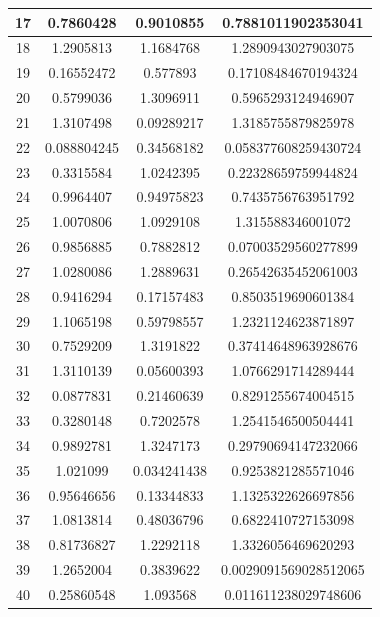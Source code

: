 \documentclass[10pt,a4paper, polish]{article}
\begin{document}
\begin{table}[H]
\begin{tabular}{|c|c|c|c|}
\hline
17 & 0.7860428 & 0.9010855 & 0.7881011902353041 \\
\hline
18 & 1.2905813 & 1.1684768 & 1.2890943027903075 \\
\hline
19 & 0.16552472 & 0.577893 & 0.17108484670194324 \\
\hline
20 & 0.5799036 & 1.3096911 & 0.5965293124946907 \\
\hline
21 & 1.3107498 & 0.09289217 & 1.3185755879825978 \\
\hline
22 & 0.088804245 & 0.34568182 & 0.058377608259430724 \\
\hline
23 & 0.3315584 & 1.0242395 & 0.22328659759944824 \\
\hline
24 & 0.9964407 & 0.94975823 & 0.7435756763951792 \\
\hline
25 & 1.0070806 & 1.0929108 & 1.315588346001072 \\
\hline
26 & 0.9856885 & 0.7882812 & 0.07003529560277899 \\
\hline
27 & 1.0280086 & 1.2889631 & 0.26542635452061003 \\
\hline
28 & 0.9416294 & 0.17157483 & 0.8503519690601384 \\
\hline
29 & 1.1065198 & 0.59798557 & 1.2321124623871897 \\
\hline
30 & 0.7529209 & 1.3191822 & 0.37414648963928676 \\
\hline
31 & 1.3110139 & 0.05600393 & 1.0766291714289444 \\
\hline
32 & 0.0877831 & 0.21460639 & 0.8291255674004515 \\
\hline
33 & 0.3280148 & 0.7202578 & 1.2541546500504441 \\
\hline
34 & 0.9892781 & 1.3247173 & 0.29790694147232066 \\
\hline
35 & 1.021099 & 0.034241438 & 0.9253821285571046 \\
\hline
36 & 0.95646656 & 0.13344833 & 1.1325322626697856 \\
\hline
37 & 1.0813814 & 0.48036796 & 0.6822410727153098 \\
\hline
38 & 0.81736827 & 1.2292118 & 1.3326056469620293 \\
\hline
39 & 1.2652004 & 0.3839622 & 0.0029091569028512065 \\
\hline
40 & 0.25860548 & 1.093568 & 0.011611238029748606 \\
\hline
\end{tabular}
\end{table}
\end{document}

